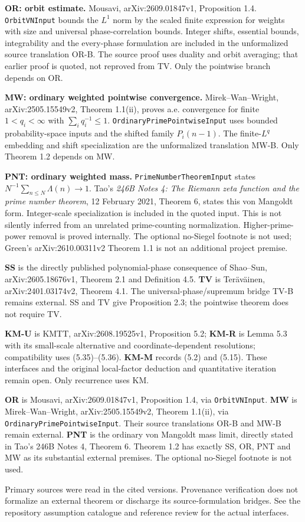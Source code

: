 \textbf{OR: orbit estimate.} Mousavi, arXiv:2609.01847v1, Proposition 1.4. \texttt{OrbitVNInput} bounds the $L^1$ norm by the scaled finite expression for weights with size and universal phase-correlation bounds. Integer shifts, essential bounds, integrability and the every-phase formulation are included in the unformalized source translation OR-B. The source proof uses duality and orbit averaging; that earlier proof is quoted, not reproved from TV. Only the pointwise branch depends on OR.

\textbf{MW: ordinary weighted pointwise convergence.} Mirek--Wan--Wright, arXiv:2505.15549v2, Theorem 1.1(ii), proves a.e. convergence for finite $1<q_i<\infty$ with $\sum_iq_i^{-1}\leq1$. \texttt{OrdinaryPrimePointwiseInput} uses bounded probability-space inputs and the shifted family $P_i(n-1)$. The finite-$L^q$ embedding and shift specialization are the unformalized translation MW-B. Only Theorem 1.2 depends on MW.

\textbf{PNT: ordinary weighted mass.} \texttt{PrimeNumberTheoremInput} states $N^{-1}\sum_{n\leq N}\Lambda(n)\to1$. Tao's \emph{246B Notes 4: The Riemann zeta function and the prime number theorem}, 12 February 2021, Theorem 6, states this von Mangoldt form. Integer-scale specialization is included in the quoted input. This is not silently inferred from an unrelated prime-counting normalization. Higher-prime-power removal is proved internally. The optional no-Siegel footnote is not used; Green's arXiv:2610.00311v2 Theorem 1.1 is not an additional project premise.

\else
\textbf{SS} is the directly published polynomial-phase consequence of Shao--Sun, arXiv:2605.18676v1, Theorem 2.1 and Definition 4.5. \textbf{TV} is Ter\"av\"ainen, arXiv:2401.03174v2, Theorem 4.1. The universal-phase/supremum bridge TV-B remains external. SS and TV give Proposition 2.3; the pointwise theorem does not require TV.

\textbf{KM-U} is KMTT, arXiv:2608.19525v1, Proposition 5.2; \textbf{KM-R} is Lemma 5.3 with its small-scale alternative and coordinate-dependent resolutions; compatibility uses (5.35)--(5.36). \textbf{KM-M} records (5.2) and (5.15). These interfaces and the original local-factor deduction and quantitative iteration remain open. Only recurrence uses KM.

\textbf{OR} is Mousavi, arXiv:2609.01847v1, Proposition 1.4, via \texttt{OrbitVNInput}. \textbf{MW} is Mirek--Wan--Wright, arXiv:2505.15549v2, Theorem 1.1(ii), via \texttt{OrdinaryPrimePointwiseInput}. Their source translations OR-B and MW-B remain external. \textbf{PNT} is the ordinary von Mangoldt mass limit, directly stated in Tao's 246B Notes 4, Theorem 6. Theorem 1.2 has exactly SS, OR, PNT and MW as its substantial external premises. The optional no-Siegel footnote is not used.
\fi

Primary sources were read in the cited versions. Provenance verification does not formalize an external theorem or discharge its source-formulation bridges. See the repository assumption catalogue and reference review for the actual interfaces.
